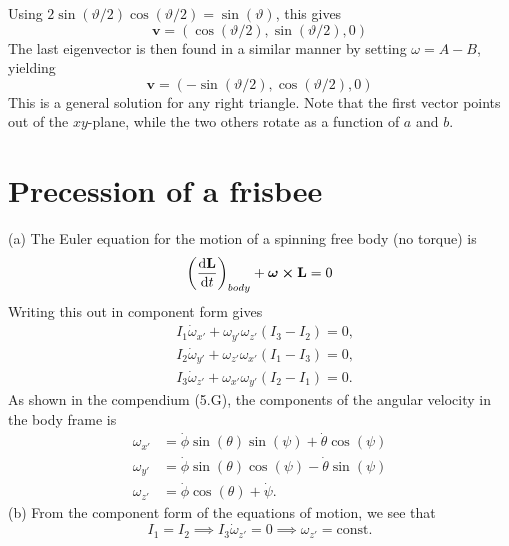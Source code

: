 \documentclass{article}
\begin{document}
        Using $2\sin(\vartheta/2) \cos(\vartheta/2) = \sin(\vartheta)$, this gives
        \begin{equation*}
            \mathbf{v} = \left(\cos(\vartheta/2), \sin(\vartheta / 2), 0 \right)
        \end{equation*}
        The last eigenvector is then found in a similar manner by setting $\omega = A - B$, yielding
        \begin{equation*}
            \mathbf{v} = \left(-\sin(\vartheta/2), \cos(\vartheta/2), 0\right)
        \end{equation*}
        This is a general solution for any right triangle. Note that the first vector points out of the $xy$-plane, while the two others rotate as a function of $a$ and $b$.

    \section{Precession of a frisbee}
        (a) The Euler equation for the motion of a spinning free body (no torque) is 
        \begin{equation*}
            \left(\dv{\mathbf{L}}{t}\right)_{body} + \boldsymbol \omega \cross \mathbf{L} = 0
        \end{equation*}
        Writing this out in component form gives
        \begin{align*}
            & I_1 \dot \omega_{x'} + \omega_{y'}\omega_{z'}(I_3 - I_2) = 0, \\
            & I_2 \dot \omega_{y'} + \omega_{z'}\omega_{x'}(I_1 - I_3) = 0, \\
            & I_3 \dot \omega_{z'} + \omega_{x'}\omega_{y'}(I_2 - I_1) = 0 .
        \end{align*}
        As shown in the compendium (5.G), the components of the angular velocity in the body frame is 
        \begin{align*}
            \omega_{x'} & = \dot \phi \sin(\theta) \sin(\psi) + \dot\theta \cos(\psi) \\
            \omega_{y'} & = \dot \phi \sin(\theta)\cos(\psi) - \dot \theta  \sin(\psi)\\
            \omega_{z'} & = \dot \phi \cos(\theta) + \dot \psi.
        \end{align*}
        (b) From the component form of the equations of motion, we see that 
        \begin{equation*}
            I_1 = I_2 \implies I_3 \dot \omega_{z'} = 0 \implies \omega_{z'} = \mathrm{const.}
        \end{equation*}
\end{document}
